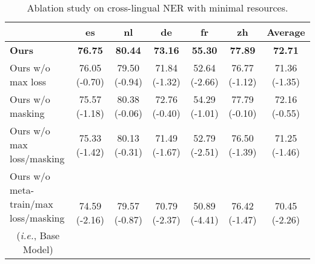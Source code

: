 \documentclass[letterpaper]{article} \usepackage{aaai20}  \usepackage{times}  \usepackage{helvet} \usepackage{courier}  \usepackage[hyphens]{url}  \usepackage{graphicx} \urlstyle{rm} \def\UrlFont{\rm}  \usepackage{graphicx}
\newcommand{\ie}{\textit{i.e.}}
\begin{document}
%
 \begin{table*}[t]
  \centering
    \setlength{\tabcolsep}{1mm}
    \begin{adjustbox}{max width=0.95\textwidth}
    \begin{tabular}{l|c|c|c|c|c|c}
      \hline
         &	es	&	nl	&	de	&	fr	&	zh	& Average\\ \hline
        \textbf{Ours} &	\textbf{76.75}	&	\textbf{80.44}	&	\textbf{73.16}	&	\textbf{55.30}	&	\textbf{77.89} &  \textbf{72.71} \\ \hline
        Ours w/o max loss &76.05	(-0.70)	&	79.50	(-0.94)	&	71.84	(-1.32)	&	52.64	(-2.66)	&	76.77	(-1.12) & 71.36 (-1.35)\\ \hline
        Ours w/o masking	&	75.57	(-1.18)	&	80.38	(-0.06)	&	72.76	(-0.40)	&	54.29	(-1.01)	&	77.79	(-0.10) & 72.16 (-0.55)\\ \hline
        Ours w/o max loss/masking &	75.33	(-1.42)	&	80.13	(-0.31)	&	71.49	(-1.67)	&	52.79	(-2.51)	&	76.50	(-1.39) & 71.25 (-1.46)\\ \hline
Ours w/o meta-train/max loss/masking & \multirow{2}{*}{74.59	(-2.16)}	&	\multirow{2}{*}{79.57	(-0.87)}	&	\multirow{2}{*}{70.79	(-2.37)}	&	\multirow{2}{*}{50.89	(-4.41)}	&	\multirow{2}{*}{76.42	(-1.47)} & \multirow{2}{*}{70.45 (-2.26)} \\
        \multicolumn{1}{c|}{(\ie, Base Model)} & & & & & \\
        \hline
    \end{tabular}
    \end{adjustbox}
    \caption{Ablation study on cross-lingual NER with minimal resources.} \label{tab:zero_shot_ablation}
\end{table*}
\end{document}
